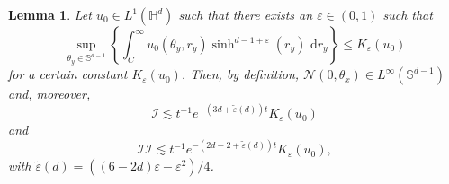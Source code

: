 \documentclass[12pt,longbibliography]{article}
\def\S{\mathbb{S}}
\def\d{\,\mathrm{d}}
\def\d{\,\mathrm{d}}
\def\H{\mathbb{H}}
\newtheorem{lem}[thm]{Lemma}
\theoremstyle{definition}
\theoremstyle{remark}
\theoremstyle{example}
\begin{document}
\begin{lem}\label{lem:growth_condition_u_0}
	Let $u_0\in L^1(\H^d)$ such that there exists an $\varepsilon\in(0,1)$ such that
	\begin{equation}\label{eq:condition_u_0_radial}
		\sup\limits_{\theta_y\in\S^{d-1}}\left\{\int_C^\infty u_0(\theta_y, r_y)\sinh^{d-1+\varepsilon}(r_y)\, \d r_y\right\}\leq K_\varepsilon(u_0)
	\end{equation}
	for a certain constant $K_\varepsilon(u_0)$. Then, by definition, $\mathcal{N}(0,\theta_x)\in L^\infty(\S^{d-1})$ and, moreover,
	\[
	\mathcal{I}\lesssim t^{-1}e^{-(3d+\tilde\varepsilon(d))t} K_\varepsilon(u_0)
	\]
	and
	\[
	\mathcal{II}\lesssim t^{-1}e^{-(2d-2+\tilde\varepsilon(d))t} K_\varepsilon(u_0),
	\]
	with $\tilde\varepsilon(d)=((6-2d)\varepsilon-\varepsilon^2)/4$.
\end{lem}
\end{document}

